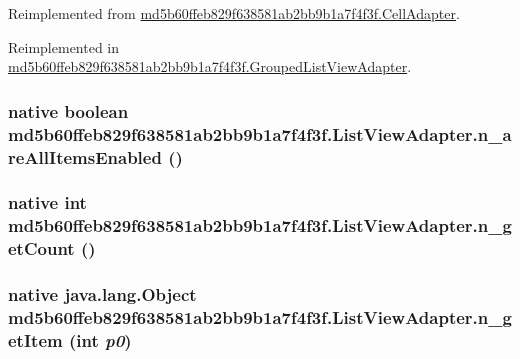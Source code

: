 Reimplemented from \hyperlink{classmd5b60ffeb829f638581ab2bb9b1a7f4f3f_1_1_cell_adapter_ad3dc816719d492f2fa5de60860e45e7}{md5b60ffeb829f638581ab2bb9b1a7f4f3f.CellAdapter}.

Reimplemented in \hyperlink{classmd5b60ffeb829f638581ab2bb9b1a7f4f3f_1_1_grouped_list_view_adapter_4634afbff45178960582fdfba5d55008}{md5b60ffeb829f638581ab2bb9b1a7f4f3f.GroupedListViewAdapter}.\hypertarget{classmd5b60ffeb829f638581ab2bb9b1a7f4f3f_1_1_list_view_adapter_3180d43510a1fead4449083cc3705c54}{
\subsubsection[{n\_\-areAllItemsEnabled}]{\setlength{\rightskip}{0pt plus 5cm}native boolean md5b60ffeb829f638581ab2bb9b1a7f4f3f.ListViewAdapter.n\_\-areAllItemsEnabled ()}}
\label{classmd5b60ffeb829f638581ab2bb9b1a7f4f3f_1_1_list_view_adapter_3180d43510a1fead4449083cc3705c54}


\hypertarget{classmd5b60ffeb829f638581ab2bb9b1a7f4f3f_1_1_list_view_adapter_485a5a7706d2d0127222a640ad6c6ed1}{
\subsubsection[{n\_\-getCount}]{\setlength{\rightskip}{0pt plus 5cm}native int md5b60ffeb829f638581ab2bb9b1a7f4f3f.ListViewAdapter.n\_\-getCount ()}}
\label{classmd5b60ffeb829f638581ab2bb9b1a7f4f3f_1_1_list_view_adapter_485a5a7706d2d0127222a640ad6c6ed1}


\hypertarget{classmd5b60ffeb829f638581ab2bb9b1a7f4f3f_1_1_list_view_adapter_057253a34e85b6bcb44d1b3e48810c4e}{
\subsubsection[{n\_\-getItem}]{\setlength{\rightskip}{0pt plus 5cm}native java.lang.Object md5b60ffeb829f638581ab2bb9b1a7f4f3f.ListViewAdapter.n\_\-getItem (int {\em p0})}}
\label{classmd5b60ffeb829f638581ab2bb9b1a7f4f3f_1_1_list_view_adapter_057253a34e85b6bcb44d1b3e48810c4e}



